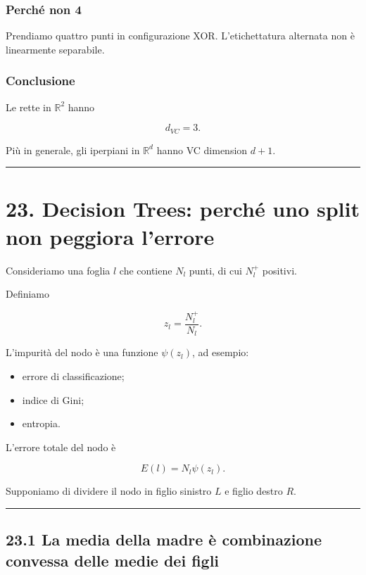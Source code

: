 \documentclass[
]{article}
\providecommand{\tightlist}{%
  \setlength{\itemsep}{0pt}\setlength{\parskip}{0pt}}
\begin{document}
\subsubsection{Perché non 4}\label{perchuxe9-non-4}

Prendiamo quattro punti in configurazione XOR. L'etichettatura alternata
non è linearmente separabile.

\subsubsection{Conclusione}\label{conclusione-12}

Le rette in \(\mathbb{R}^2\) hanno

\[
d_{VC}=3.
\]

Più in generale, gli iperpiani in \(\mathbb{R}^d\) hanno VC dimension
\(d+1\).

\begin{center}\rule{0.5\linewidth}{0.5pt}\end{center}

\section{23. Decision Trees: perché uno split non peggiora
l'errore}\label{decision-trees-perchuxe9-uno-split-non-peggiora-lerrore}

Consideriamo una foglia \(l\) che contiene \(N_l\) punti, di cui
\(N_l^+\) positivi.

Definiamo

\[
z_l = \frac{N_l^+}{N_l}.
\]

L'impurità del nodo è una funzione \(\psi(z_l)\), ad esempio:

\begin{itemize}
\tightlist
\item
  errore di classificazione;
\item
  indice di Gini;
\item
  entropia.
\end{itemize}

L'errore totale del nodo è

\[
E(l)=N_l\psi(z_l).
\]

Supponiamo di dividere il nodo in figlio sinistro \(L\) e figlio destro
\(R\).

\begin{center}\rule{0.5\linewidth}{0.5pt}\end{center}

\subsection{23.1 La media della madre è combinazione convessa delle
medie dei
figli}\label{la-media-della-madre-uxe8-combinazione-convessa-delle-medie-dei-figli}
\end{document}
